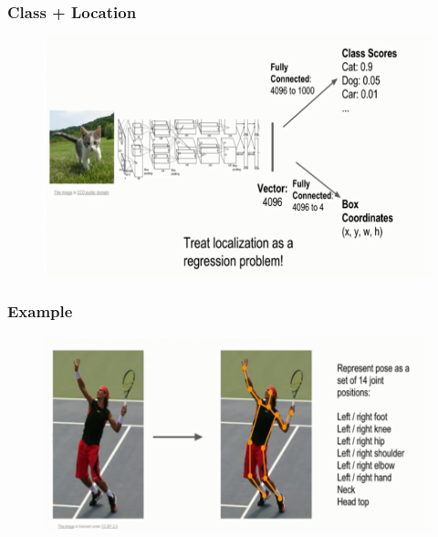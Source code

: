 \documentclass{beamer}
\begin{document}
\begin{frame}
	\frametitle{Class + Location}
	
	\begin{figure}
		\includegraphics[width=\linewidth]{Pics/loc2.PNG}

	\end{figure}
	
\end{frame}
\begin{frame}
	\frametitle{Example}
	
	\begin{figure}
		\includegraphics[width=\linewidth]{Pics/humanpose.PNG}
		
	\end{figure}
	
\end{frame}
\end{document}
